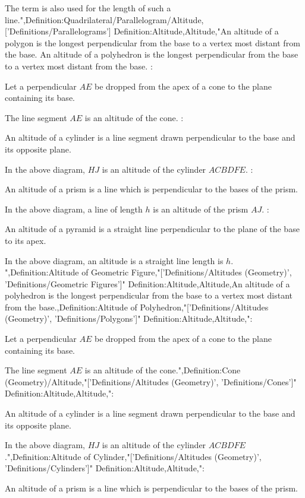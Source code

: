 The term is also used for the length of such a line.",Definition:Quadrilateral/Parallelogram/Altitude,['Definitions/Parallelograms']
Definition:Altitude,Altitude,"An altitude of a polygon is the longest perpendicular from the base to a vertex most distant from the base.
An altitude of a polyhedron is the longest perpendicular from the base to a vertex most distant from the base.
:

Let a perpendicular $AE$ be dropped from the apex of a cone to the plane containing its base.

The line segment $AE$ is an altitude of the cone.
:

An altitude of a cylinder is a line segment drawn perpendicular to the base and its opposite plane.


In the above diagram, $HJ$ is an altitude of the cylinder $ACBDFE$.
:

An altitude of a prism is a line which is perpendicular to the bases of the prism.

In the above diagram, a line of length $h$ is an altitude of the prism $AJ$.
:

An altitude of a pyramid is a straight line perpendicular to the plane of the base to its apex.

In the above diagram, an altitude is a straight line length is $h$.
",Definition:Altitude of Geometric Figure,"['Definitions/Altitudes (Geometry)', 'Definitions/Geometric Figures']"
Definition:Altitude,Altitude,An altitude of a polyhedron is the longest perpendicular from the base to a vertex most distant from the base.,Definition:Altitude of Polyhedron,"['Definitions/Altitudes (Geometry)', 'Definitions/Polygons']"
Definition:Altitude,Altitude,":

Let a perpendicular $AE$ be dropped from the apex of a cone to the plane containing its base.

The line segment $AE$ is an altitude of the cone.",Definition:Cone (Geometry)/Altitude,"['Definitions/Altitudes (Geometry)', 'Definitions/Cones']"
Definition:Altitude,Altitude,":

An altitude of a cylinder is a line segment drawn perpendicular to the base and its opposite plane.


In the above diagram, $HJ$ is an altitude of the cylinder $ACBDFE$.",Definition:Altitude of Cylinder,"['Definitions/Altitudes (Geometry)', 'Definitions/Cylinders']"
Definition:Altitude,Altitude,":

An altitude of a prism is a line which is perpendicular to the bases of the prism.

